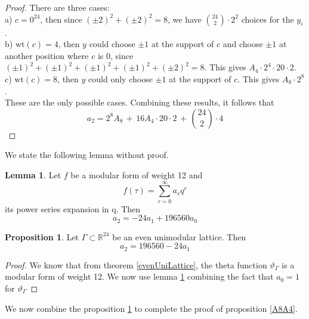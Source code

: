 \documentclass[12pt]{article}
\theoremstyle{definition}
\newtheorem{lemma}[theorem]{Lemma}
\newtheorem{prop}[theorem]{Proposition}
\numberwithin{equation}{theorem}
\numberwithin{figure}{theorem}
\newcommand{\thetaFunction}[1]{\ensuremath{\vartheta_{#1}}}
\newcommand{\wt}[1]{\ensuremath{\text{wt}(#1)}}
\newcommand{\Real}{\ensuremath{\mathbb{R}}}
\begin{document}
\begin{proof}
There are three cases:\\
a) $c = 0^{24}$, then since $(\pm2)^2 + (\pm2)^2 = 8$, we have $\binom{24}{2} \cdot 2^2$ choices for the $y_i$.\\
b) $\wt{c} = 4$, then $y$ could choose $\pm1$ at the support of $c$ and choose $\pm1$ at another position where $c$ is 0, since $(\pm1)^2 + (\pm1)^2+ (\pm1)^2+ (\pm1)^2 + (\pm2)^2 = 8$. This gives $A_4 \cdot 2^4 \cdot 20 \cdot 2$.\\
c) $\wt{c} = 8$, then $y$ could only choose $\pm1$ at the support of $c$. This gives $A_8 \cdot 2^8$.\\
These are the only possible cases. Combining these results, it follows that 
\begin{equation}\label{a2A8A4Eqn}
	a_2 = 2^8A_8 \, + \,  16 A_4 \cdot 20 \cdot 2 \, + \, \binom{24}{2}\cdot 4
\end{equation}
\end{proof}
We state the following lemma without proof.
\begin{lemma}\label{a2a0a1}
Let $f$ be a modular form of weight 12 and
\[
	f(\tau) = \sum_{r = 0}^{\infty}a_rq^r
\]
its power series expansion in q. Then
\[
	a_2 = -24a_1 + 196560a_0
\]
\end{lemma}
\begin{prop}\label{a2a1}
Let $\Gamma \subset \Real^24$ be an even unimodular lattice. Then 
\[
	a_2 = 196560 - 24a_1
\] 
\end{prop}
\begin{proof}
We know that from theorem \ref{evenUniLattice}, the theta function $\thetaFunction{\Gamma}$ is a modular form of weight 12. We now use lemma \ref{a2a0a1} combining the fact that $a_0 = 1$ for $\thetaFunction{\Gamma}$
\end{proof}
We now combine the proposition \ref{a2a1} to complete the proof of proposition \ref{A8A4}.
\end{document}
